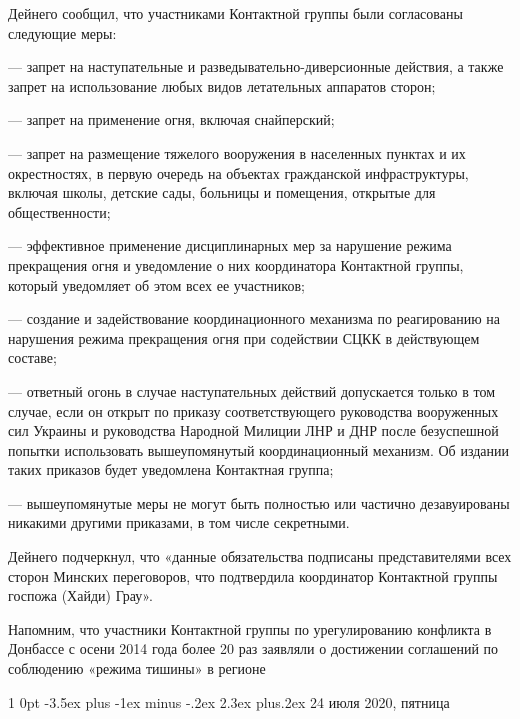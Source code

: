 \documentclass[a4paper,11pt]{extreport}
\makeatletter
\renewcommand\section{%
  \clearpage
  \@startsection{section}%
    {1}%
    {0pt}%
    {-3.5ex plus -1ex minus -.2ex}%
    {2.3ex plus.2ex}%
    {\centering\normalfont\Huge\bfseries}%
}
\makeatother
\begin{document}
Дейнего сообщил, что участниками Контактной группы были согласованы следующие
меры:

— запрет на наступательные и разведывательно-диверсионные действия, а также
запрет на использование любых видов летательных аппаратов сторон;

— запрет на применение огня, включая снайперский;

— запрет на размещение тяжелого вооружения в населенных пунктах и их
окрестностях, в первую очередь на объектах гражданской инфраструктуры, включая
школы, детские сады, больницы и помещения, открытые для общественности;

— эффективное применение дисциплинарных мер за нарушение режима прекращения
огня и уведомление о них координатора Контактной группы, который уведомляет об
этом всех ее участников;

— создание и задействование координационного механизма по реагированию на
нарушения режима прекращения огня при содействии СЦКК в действующем составе;

— ответный огонь в случае наступательных действий допускается только в том
случае, если он открыт по приказу соответствующего руководства вооруженных сил
Украины и руководства Народной Милиции ЛНР и ДНР после безуспешной попытки
использовать вышеупомянутый координационный механизм. Об издании таких приказов
будет уведомлена Контактная группа;

— вышеупомянутые меры не могут быть полностью или частично дезавуированы
никакими другими приказами, в том числе секретными.

Дейнего подчеркнул, что «данные обязательства подписаны представителями всех
сторон Минских переговоров, что подтвердила координатор Контактной группы
госпожа (Хайди) Грау».

Напомним, что участники Контактной группы по урегулированию конфликта в
Донбассе с осени 2014 года более 20 раз заявляли о достижении соглашений по
соблюдению «режима тишины» в регионе
 
 

\clearpage
\section{24 июля 2020, пятница}
\label{sec:24_07_2020}
\end{document}
